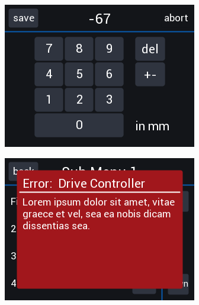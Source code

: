 \begin{frame}
\begin{columns}
\begin{column}{0.7\textwidth}
\begin{figure}
				\vspace{1.4em}
				\begin{subfigure}{0.4\textwidth}
					\includegraphics[width=\textwidth]{../images/displayNumberInput.png}
				\end{subfigure}
				\hspace{0.9em}
				\begin{subfigure}{0.4\textwidth}
					\includegraphics[width=\textwidth]{../images/displayNotification.png}
				\end{subfigure}
			\end{figure}
		\end{column}
	\end{columns}
	
\end{frame}